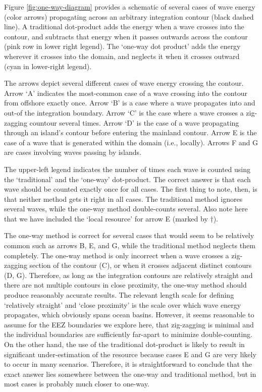 Figure \ref{fig:one-way-diagram} provides a schematic of several cases of wave energy (color arrows) propagating across an arbitrary integration contour (black dashed line). A traditional dot-product adds the energy when a wave crosses into the contour, and subtracts that energy when it passes outwards across the contour (pink row in lower right legend). The `one-way dot product' adds the energy wherever it crosses into the domain, and neglects it when it crosses outward (cyan in lower-right legend).

The arrows depict several different cases of wave energy crossing the contour. Arrow `A' indicates the most-common case of a wave crossing into the contour from offshore exactly once. Arrow `B' is a case where a wave propagates into and out-of the integration boundary. Arrow `C' is the case where a wave crosses a zig-zagging countour several times. Arrow `D' is the case of a wave propagating through an island's contour before entering the mainland contour. Arrow E is the case of a wave that is generated within the domain (i.e., locally). Arrows F and G are cases involving waves passing by islands.

The upper-left legend indicates the number of times each wave is counted using the `traditional' and the `one-way' dot-product. The correct answer is that each wave should be counted exactly once for all cases. The first thing to note, then, is that neither method gets it right in all cases. The traditional method ignores several waves, while the one-way method double-counts several. Also note here that we have included the `local resource' for arrow E (marked by $\dagger$).

The one-way method is correct for several cases that would seem to be relatively common such as arrows B, E, and G, while the traditional method neglects them completely. The one-way method is only incorrect when a wave crosses a zig-zagging section of the contour (C), or when it crosses adjacent distinct contours (D, G). Therefore, as long as the integration contours are relatively straight and there are not multiple contours in close proximity, the one-way method should produce reasonably accurate results. 
The relevant length scale for defining `relatively straight' and `close proximity' is the scale over which wave energy propagates, which obviously spans ocean basins. However, it seems reasonable to assume for the EEZ boundaries we explore here, that zig-zagging is minimal and the individual boundaries are sufficiently far-apart to minimize double-counting. On the other hand, the use of the traditional dot-product is likely to result in significant under-estimation of the resource because cases E and G are very likely to occur in many scenarios. Therefore, it is straightforward to conclude that the exact answer lies somewhere between the one-way and traditional method, but in most cases is probably much closer to one-way.

